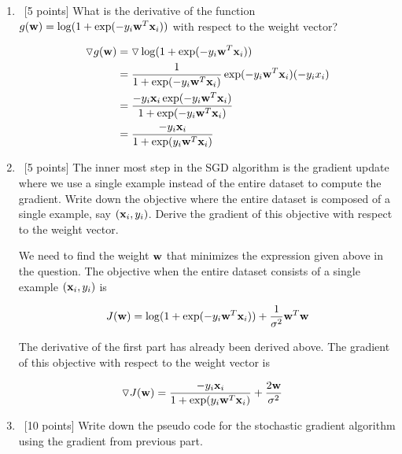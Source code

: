 \begin{enumerate}
\item ~[5 points] What is the derivative of the function $g({\bf w}) = \log(1+ \exp(-y_i{\bf w}^T{\bf x}_i))$ with respect to the weight vector?

\begin{equation*}
\begin{aligned}
\triangledown g({\bf w}) &= \triangledown \log(1+ \exp(-y_i{\bf w}^T{\bf x}_i))\\
&= \frac{1}{1+ \exp(-y_i{\bf w}^T{\bf x}_i)} \exp(-y_i{\bf w}^T{\bf x}_i) (-y_i x_i)\\
&= \frac{-y_i {\bf x}_i \exp(-y_i{\bf w}^T{\bf x}_i)}{1+ \exp(-y_i{\bf w}^T{\bf x}_i)} \\
&= \frac{-y_i {\bf x}_i}{1+ \exp(y_i{\bf w}^T{\bf x}_i)}
\end{aligned}
\end{equation*}


\item ~[5 points] The inner most step in the SGD algorithm is the gradient update where we use a single example instead of the entire dataset to compute the gradient. Write down the objective where the entire dataset is composed of a single example, say $({\bf x}_i, y_i)$. Derive the gradient of this objective with respect to the weight vector.

We need to find the weight ${\bf w}$ that minimizes the expression given above in the question. The objective when the entire dataset consists of a single example $({\bf x}_i, y_i)$ is 

\begin{equation*}
\begin{aligned}
J({\bf w}) &= \log(1+ \exp(-y_i{\bf w}^T{\bf x}_i)) + \frac{1}{\sigma^2}{\bf w}^T{\bf w}\\
\end{aligned}
\end{equation*}

The derivative of the first part has already been derived above. The gradient of this objective with respect to the weight vector is

\begin{equation*}
\begin{aligned}
\triangledown J({\bf w}) &= \frac{-y_i {\bf x}_i}{1+ \exp(y_i{\bf w}^T{\bf x}_i)} + \frac{2{\bf w}}{\sigma^2}
\end{aligned}
\end{equation*}

\item ~[10 points] Write down the pseudo code for the stochastic gradient algorithm using the gradient from previous part.


\end{enumerate}
